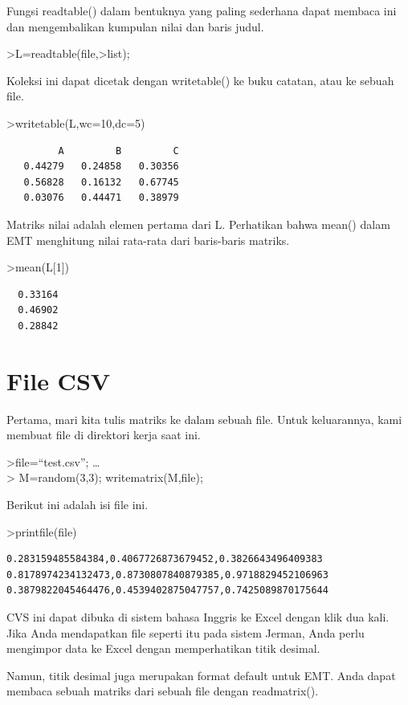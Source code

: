 \documentclass[
]{book}
\begin{document}
Fungsi readtable() dalam bentuknya yang paling sederhana dapat membaca ini dan mengembalikan kumpulan nilai dan baris judul.

\textgreater L=readtable(file,\textgreater list);

Koleksi ini dapat dicetak dengan writetable() ke buku catatan, atau ke sebuah file.

\textgreater writetable(L,wc=10,dc=5)

\begin{verbatim}
         A         B         C
   0.44279   0.24858   0.30356
   0.56828   0.16132   0.67745
   0.03076   0.44471   0.38979
\end{verbatim}

Matriks nilai adalah elemen pertama dari L. Perhatikan bahwa mean() dalam EMT menghitung nilai rata-rata dari baris-baris matriks.

\textgreater mean(L{[}1{]})

\begin{verbatim}
  0.33164 
  0.46902 
  0.28842 
\end{verbatim}

\chapter{File CSV}\label{file-csv}

Pertama, mari kita tulis matriks ke dalam sebuah file. Untuk keluarannya, kami membuat file di direktori kerja saat ini.

\textgreater file=``test.csv''; \ldots{}\\
\textgreater{} M=random(3,3); writematrix(M,file);

Berikut ini adalah isi file ini.

\textgreater printfile(file)

\begin{verbatim}
0.283159485584384,0.4067726873679452,0.3826643496409383
0.8178974234132473,0.8730807840879385,0.9718829452106963
0.3879822045464476,0.4539402875047757,0.7425089870175644
\end{verbatim}

CVS ini dapat dibuka di sistem bahasa Inggris ke Excel dengan klik dua kali. Jika Anda mendapatkan file seperti itu pada sistem Jerman, Anda perlu mengimpor data ke Excel dengan memperhatikan titik desimal.

Namun, titik desimal juga merupakan format default untuk EMT. Anda dapat membaca sebuah matriks dari sebuah file dengan readmatrix().
\end{document}
